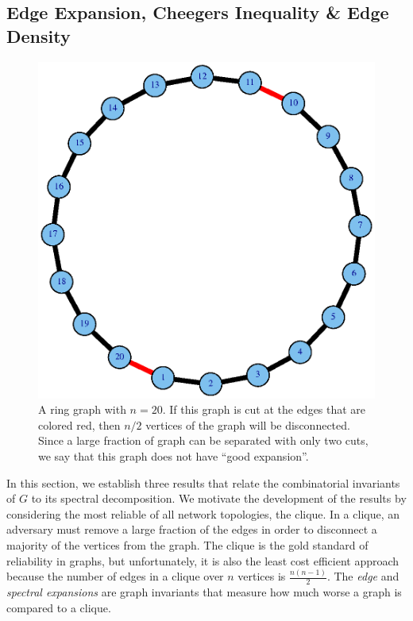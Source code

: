 \documentclass{amsart}
\theoremstyle{definition}
\theoremstyle{remark}
\numberwithin{equation}{section}
\begin{document}
\subsection{Edge Expansion, Cheegers Inequality \& Edge Density}
\begin{figure}
    \centering
    \includegraphics[scale=0.35]{ringGraph.eps}
    \caption{A ring graph with $n=20$. If this graph is cut at the edges that are colored red, then $n/2$ vertices of the graph will be disconnected. Since a large fraction of graph can be separated with only two cuts, we say that this graph does not have ``good expansion''.}
    \label{fig:ringGraph}
\end{figure}
In this section, we establish three results that relate the combinatorial invariants of $G$ to its spectral decomposition. We motivate the development of the results by considering the most reliable of all network topologies, the clique. In a clique, an adversary must remove a large fraction of the edges in order to disconnect a majority of the vertices from the graph. The clique is the gold standard of reliability in graphs, but unfortunately, it is also the least cost efficient approach because the number of edges in a clique over $n$ vertices is $\frac{n(n-1)}{2}$. The \textit{edge} and \textit{spectral expansions} are graph invariants that measure how much worse a graph is compared to a clique. 
\end{document}

